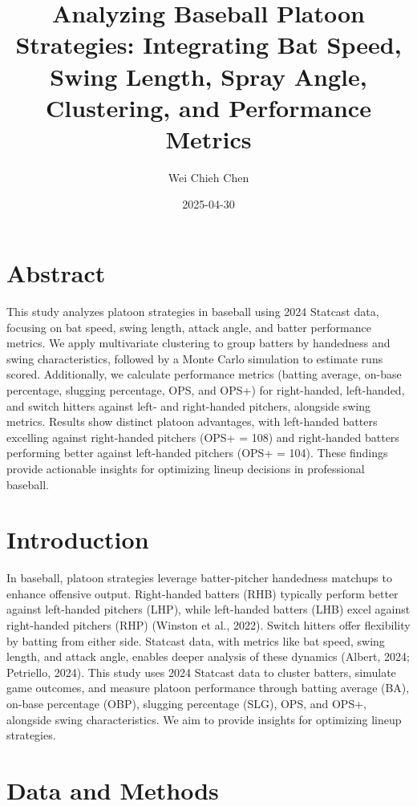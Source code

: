 \documentclass[
]{article}
\title{Analyzing Baseball Platoon Strategies: Integrating Bat Speed,
Swing Length, Spray Angle, Clustering, and Performance Metrics}
\author{Wei Chieh Chen}
\date{2025-04-30}
\begin{document}
\maketitle

{
\setcounter{tocdepth}{2}
\tableofcontents
}
\clearpage

\hypertarget{abstract}{%
\section{Abstract}\label{abstract}}

This study analyzes platoon strategies in baseball using 2024 Statcast
data, focusing on bat speed, swing length, attack angle, and batter
performance metrics. We apply multivariate clustering to group batters
by handedness and swing characteristics, followed by a Monte Carlo
simulation to estimate runs scored. Additionally, we calculate
performance metrics (batting average, on-base percentage, slugging
percentage, OPS, and OPS+) for right-handed, left-handed, and switch
hitters against left- and right-handed pitchers, alongside swing
metrics. Results show distinct platoon advantages, with left-handed
batters excelling against right-handed pitchers (OPS+ = 108) and
right-handed batters performing better against left-handed pitchers
(OPS+ = 104). These findings provide actionable insights for optimizing
lineup decisions in professional baseball.

\hypertarget{introduction}{%
\section{Introduction}\label{introduction}}

In baseball, platoon strategies leverage batter-pitcher handedness
matchups to enhance offensive output. Right-handed batters (RHB)
typically perform better against left-handed pitchers (LHP), while
left-handed batters (LHB) excel against right-handed pitchers (RHP)
(Winston et al., 2022). Switch hitters offer flexibility by batting from
either side. Statcast data, with metrics like bat speed, swing length,
and attack angle, enables deeper analysis of these dynamics (Albert,
2024; Petriello, 2024). This study uses 2024 Statcast data to cluster
batters, simulate game outcomes, and measure platoon performance through
batting average (BA), on-base percentage (OBP), slugging percentage
(SLG), OPS, and OPS+, alongside swing characteristics. We aim to provide
insights for optimizing lineup strategies.

\hypertarget{data-and-methods}{%
\section{Data and Methods}\label{data-and-methods}}
\end{document}
